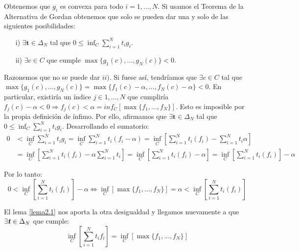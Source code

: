 	Obtenemos que $ g_i $ es convexa para todo $ i = 1, ..., N $. Si usamos el Teorema de la Alternativa de Gordan obtenemos que solo se pueden dar una y solo de las siguientes posibilidades:
	
	\begin{itemize}
		\item[i)] $ \exists \mathbf{t} \in \Delta_N $ tal que $ 0 \leq \inf_{C}  \sum_{i=1}^{N}{t_i g_i}$.
		\item[ii)] $ \exists c \in C $ que cumple $ \max \lbrace g_1 (c), ..., g_N(c) \rbrace < 0 $.
	\end{itemize}
	
	Razonemos que no se puede dar $ ii) $. Si fuese así, tendríamos que $ \exists c \in C $ tal que $ \max \lbrace g_1(c), ..., g_N(c) \rbrace  =  \max \lbrace f_1(c) - \alpha, ..., f_N(c) - \alpha \rbrace < 0 $. En particular, existiría un índice $ j \in {1,...,N} $ que cumpliría $ f_j(c) - \alpha < 0 \Longrightarrow f_j(c) < \alpha = inf_{C}\left[ \max \lbrace f_1, ..., f_N \rbrace \right] $. Esto es imposible por la propia definición de ínfimo. Por ello, afirmamos que $ \exists \mathbf{t} \in \Delta_N $ tal que $ 0 \leq \inf_{C}  \sum_{i=1}^{N}{t_i g_i}$. Desarrollando el sumatorio:
	\begin{equation*}
	\begin{split}
	0 &< \inf_{C}  \sum_{i=1}^{N}{t_i g_i} = \inf_{C}  \sum_{i=1}^{N}{t_i(f_i - \alpha)} = \inf_{C} \left[ \sum_{i=1}^{N}{t_i(f_i)} - \sum_{i=1}^{N}{t_i\alpha} \right]\\
	&= \inf_{C} \left[ \sum_{i=1}^{N}{t_i(f_i)} -\alpha \sum_{i=1}^{N}{t_i} \right] = \inf_{C} \left[ \sum_{i=1}^{N}{t_i(f_i)} - \alpha \right] = \inf_{C} \left[ \sum_{i=1}^{N}{t_i(f_i)}\right] - \alpha
	\end{split}
	\end{equation*}
	
	Por lo tanto:
	\[
	0 < \inf_{C} \left[ \sum_{i=1}^{N}{t_i(f_i)}\right] - \alpha \Longleftrightarrow \inf_{C}\left[ \max \lbrace f_1, ..., f_N \rbrace \right] = \alpha  < \inf_{C} \left[ \sum_{i=1}^{N}{t_i(f_i)}\right]
	\]
	
	El lema \ref{lema2.1} nos aporta la otra desigualdad y llegamos nuevamente a que $ \exists \textbf{\emph{t}} \in \Delta_N $ que cumple:
		\[
	\inf_C\left[ \sum_{i=1}^{N} t_i f_i \right] = \inf_C \left[ \max \lbrace f_1, ..., f_N \rbrace \right] \]
	